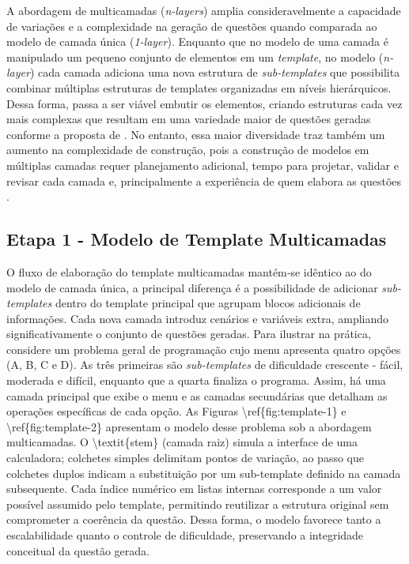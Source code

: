 A abordagem de multicamadas (\textit{n-layers}) amplia consideravelmente a capacidade de variações e a complexidade na geração de questões quando comparada ao modelo de camada única (\textit{1-layer}).  Enquanto que no modelo de uma camada é manipulado um pequeno conjunto de elementos em um \textit{template}, no modelo (\textit{n-layer}) cada camada adiciona uma nova estrutura de \textit{sub-templates} que possibilita combinar múltiplas estruturas de templates organizadas em níveis hierárquicos. Dessa forma, passa a ser viável embutir os elementos, criando estruturas cada vez mais complexas que resultam em uma variedade maior  de questões geradas conforme a proposta de  \parencite{lai2013}. No entanto, essa maior diversidade traz também um aumento na complexidade de construção, pois a construção de modelos em múltiplas camadas requer planejamento adicional, tempo para projetar, validar e revisar cada camada e, principalmente a experiência de quem elabora as questões \parencite{gierl2021}.  

\subsection{Etapa 1 - Modelo de Template Multicamadas }

O fluxo de elaboração do template multicamadas mantém‐se idêntico ao do modelo de camada única, a principal diferença é a possibilidade de adicionar \textit{sub-templates} dentro do template principal que agrupam blocos adicionais de informações. Cada nova camada introduz cenários e variáveis extra, ampliando significativamente o conjunto de questões geradas. Para ilustrar na prática, considere um problema geral de programação cujo menu apresenta quatro opções (A, B, C e D). As três primeiras são \textit{sub-templates} de dificuldade crescente - fácil, moderada e difícil, enquanto que a quarta finaliza o programa. Assim, há uma camada principal que exibe o menu e as camadas secundárias que detalham as operações específicas de cada opção. As Figuras \textbackslash{}ref\{fig:template-1\} e \textbackslash{}ref\{fig:template-2\} apresentam o modelo desse problema sob a abordagem multicamadas. O \textbackslash{}textit\{stem\} (camada raiz) simula a interface de uma calculadora; colchetes simples delimitam pontos de variação, ao passo que colchetes duplos indicam a substituição por um sub-template definido na camada subsequente. Cada índice numérico em listas internas corresponde a um valor possível assumido pelo template, permitindo reutilizar a estrutura original sem comprometer a coerência da questão. Dessa forma, o modelo favorece tanto a escalabilidade quanto o controle de dificuldade, preservando a integridade conceitual da questão gerada.

